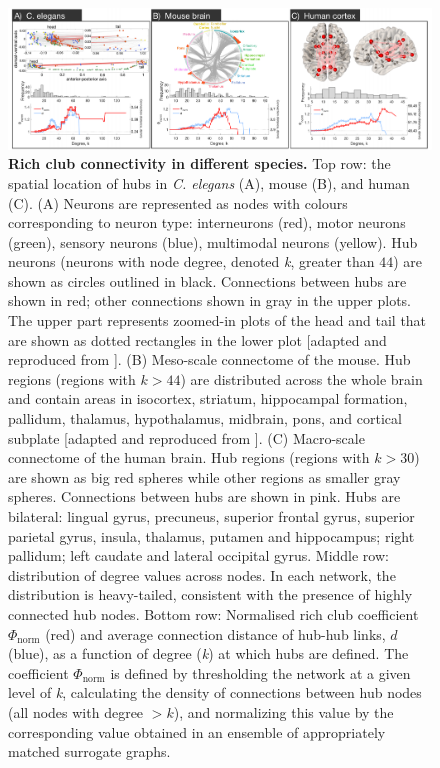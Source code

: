 \begin{figure}[h!]
\begin{center}
\includegraphics[width=1\textwidth]{Chapter3/Ch3Fig2.pdf}%
\end{center}
\caption{\textbf{Rich club connectivity in different species.} Top row: the spatial location of hubs in \textit{C. elegans} (A), mouse (B), and human (C). 
(A) Neurons are represented as nodes with colours corresponding to neuron type: interneurons (red), motor neurons (green), sensory neurons (blue), multimodal neurons (yellow). Hub neurons (neurons with node degree, denoted \textit{k}, greater than $44$) are shown as circles outlined in black. Connections between hubs are shown in red; other connections shown in gray in the upper plots. The upper part represents zoomed-in plots of the head and tail that are shown as dotted rectangles in the lower plot [adapted and reproduced from \citet{Arnatkeviciute2018}]. 
(B) Meso-scale connectome of the mouse. Hub regions (regions with $k > 44$) are distributed across the whole brain and contain areas in isocortex, striatum, hippocampal formation, pallidum, thalamus, hypothalamus, midbrain, pons, and cortical subplate [adapted and reproduced from \citet{Fulcher2016}].
(C) Macro-scale connectome of the human brain. Hub regions (regions with $k > 30$) are shown as big red spheres while other regions as smaller gray spheres. Connections between hubs are shown in pink. Hubs are bilateral: lingual gyrus, precuneus, superior frontal gyrus, superior parietal gyrus, insula, thalamus, putamen and hippocampus; right pallidum; left caudate and lateral occipital gyrus. 
Middle row: distribution of degree values across nodes. In each network, the distribution is heavy-tailed, consistent with the presence of highly connected hub nodes. 
Bottom row: Normalised rich club coefficient $\Phi_\mathrm{norm}$ (red) and average connection distance of hub-hub links, $d$ (blue), as a function of degree (\textit{k}) at which hubs are defined. 
The coefficient $\Phi_\mathrm{norm}$ is defined by thresholding the network at a given level of \textit{k}, calculating the density of connections between hub nodes (all nodes with degree $ > k$), and normalizing this value by the corresponding value obtained in an ensemble of appropriately matched surrogate graphs. 
}
\end{figure}
